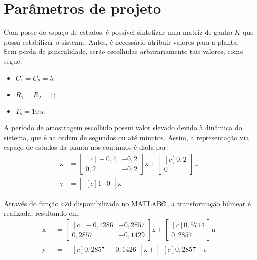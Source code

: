 \section{Parâmetros de projeto}
Com posse do espaço de estados, é possível sintetizar uma matriz de ganho $K$ que possa estabilizar o sistema. Antes, é necessário atribuir valores para a planta. Sem perda de generalidade, serão escolhidas arbitrariamente tais valores, como segue:
\begin{itemize}
\item $C_1 = C_2 = 5$;
\item $R_1 = R_2 = 1$;
\item $T_s = \SI{10}{\second}$.
\end{itemize}

A período de amostragem escolhido possui valor elevado devido à dinâmica do sistema, que é na ordem de segundos ou até minutos. Assim, a representação via espaço de estados da planta nos contínuos é dada por:
\begin{subequations}
\begin{align}
\dot{\pmb{\mathrm{x}}} &= \begin{bmatrix*}[c]
-0,4 & -0,2\\
0,2 & -0,2
\end{bmatrix*}\pmb{\mathrm{x}} + \begin{bmatrix*}[c]
0,2\\
0
\end{bmatrix*}\pmb{\mathrm{u}}\label{eq:SSCTCEntrada}\\
\pmb{\mathrm{y}} &= \begin{bmatrix*}[c]
1 & 0
\end{bmatrix*}\pmb{\mathrm{x}}\label{eq:SSCTCSaida}
\end{align}
\end{subequations}

Através do função \texttt{c2d} disponibilizada no MATLAB$\copyright$\cite{MATLAB}, a transformação bilinear é realizada, resultando em:
\begin{subequations}
\begin{align}
\pmb{\mathrm{x^{+}}} &= \begin{bmatrix*}[c]
-0,4286 & -0,2857\\
0,2857 & -0,1429
\end{bmatrix*}\pmb{\mathrm{x}} + \begin{bmatrix*}[c]
0,5714\\
0,2857
\end{bmatrix*}\pmb{\mathrm{u}}\label{eq:SSDTCEntrada}\\
\pmb{\mathrm{y}} &= \begin{bmatrix*}[c]
0,2857 & -0,1426
\end{bmatrix*}\pmb{\mathrm{x}} + \begin{bmatrix*}[c]
0,2857
\end{bmatrix*}\pmb{\mathrm{u}}\label{eq:SSDTCSaida}
\end{align}
\end{subequations}

